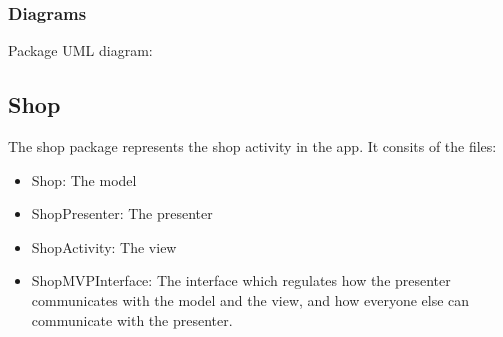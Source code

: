 \documentclass{article}
\begin{document}
\subsubsection{Diagrams}
\begin{center}
    Package UML diagram:\\
\end{center}

\subsection{Shop}
The shop package represents the shop activity in the app. It consits of the files:
\begin{itemize}
    \item Shop: The model
    \item ShopPresenter: The presenter
    \item ShopActivity: The view
    \item ShopMVPInterface: The interface which regulates how the presenter communicates with the model and the view, and how everyone else can communicate with the presenter.
\end{itemize}
\end{document}
